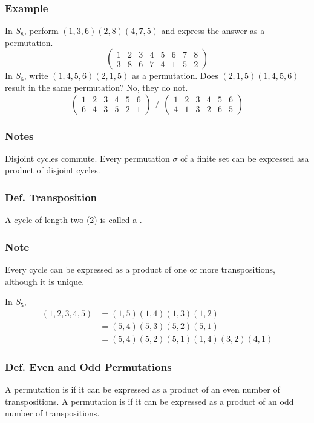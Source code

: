 \subsubsection*{Example}
In $S_8$, perform $(1,3,6)(2,8)(4,7,5)$ and express the answer as a permutation.
\[
    \begin{pmatrix}
        1 & 2 & 3 & 4 & 5 & 6 & 7 & 8 \\
        3 & 8 & 6 & 7 & 4 & 1 & 5 & 2
    \end{pmatrix}
\]
In $S_6$, write $(1,4,5,6)(2,1,5)$ as a permutation. Does $(2,1,5)(1,4,5,6)$ result in the same permutation? No, they do not.
\[
    \begin{pmatrix}
        1 & 2 & 3 & 4 & 5 & 6 \\
        6 & 4 & 3 & 5 & 2 & 1
    \end{pmatrix} \neq
    \begin{pmatrix}
        1 & 2 & 3 & 4 & 5 & 6 \\
        4 & 1 & 3 & 2 & 6 & 5
    \end{pmatrix}
\]

\subsubsection*{Notes}
Disjoint cycles commute. Every permutation $\sigma$ of a finite set can be expressed asa product of disjoint cycles.

\subsubsection{Def. Transposition}
A cycle of length two (2) is called a .

\subsubsection*{Note}
Every cycle can be expressed as a product of one or more transpositions, although it is  unique.

In $S_5$,
\begin{align*}
    (1,2,3,4,5) & = (1,5)(1,4)(1,3)(1,2) \\
    & = (5,4)(5,3)(5,2)(5,1) \\
    & = (5,4)(5,2)(5,1)(1,4)(3,2)(4,1)
\end{align*}

\subsubsection{Def. Even and Odd Permutations}
A permutation is  if it can be expressed as a product of an even number of transpositions. A permutation is  if it can be expressed as a product of an odd number of transpositions.

